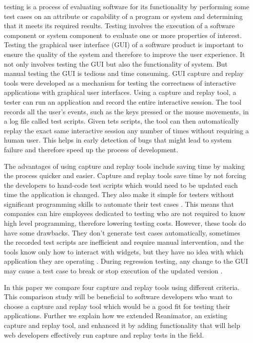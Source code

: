\documentclass[12pt,journal]{IEEEtran}
\begin{document}
 testing is a process of  evaluating software for its functionality by performing some test cases on an attribute or capability of a program or system and determining that it meets its required results. Testing involves the execution of a software component or system component to evaluate one or more properties of interest. Testing the graphical user interface (GUI) of a software product is important to ensure the quality of the system and therefore to improve the user experience\cite{Nedyalkova:2013:OSC:2494444.2494464}. It not only involves testing the GUI but also the functionality of system. But manual testing the GUI is tedious and time consuming. GUI capture and replay tools were developed as a mechanism for testing the correctness of interactive applications with graphical user interfaces. Using a capture and replay tool, a tester can run an application and record the entire interactive session. The tool records all the user's events, such as the keys pressed or the mouse movements, in a log file called test scripts. Given tets scripts, the tool can then automatically replay the exact same interactive session any number of times without requiring a human user. This helps in early detection of bugs that might lead to system failure and therefore speed up the process of development.
\par
The advantages of using capture and replay tools include saving time by making the process quicker and easier. Capture and replay tools save time by not forcing the developers to hand-code test scripts which would need to be updated each time the application is changed. They also make it simple for testers without significant programming skills to automate their test cases \cite{McMaster:2009:EHF:1547559.1548260}. This means that companies can hire employees dedicated to testing who are not required to know high level programming, therefore lowering testing costs. However, these tools do have some drawbacks. They don't generate test cases automatically, sometimes the recorded test scripts are inefficient and require manual intervention, and the tools know only how to interact with widgets, but they have no idea with which application they are operating \cite{michaelsilverstein2003}. During regression testing, any change to the GUI may cause a test case to break or stop execution of the updated version \cite{McMaster:2009:EHF:1547559.1548260}.
\par
In this paper we compare four capture and replay tools using different criteria. This comparison study will be beneficial to software developers who want to choose a capture and replay tool which would be a good fit for testing their applications. Further we explain how we extended Reanimator, an existing capture and replay tool, and enhanced it by adding functionality that will help web developers effectively run capture and replay tests in the field.
\end{document}
